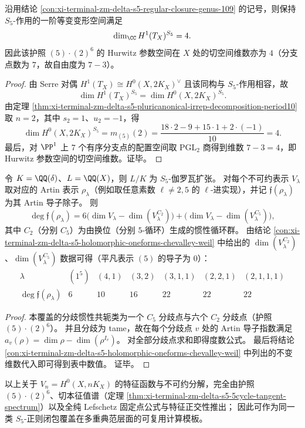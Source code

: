 \begin{proposition}\label{prop:xi-terminal-zm-delta-s5-equivariant-deformation-dimension-4}
沿用结论 \ref{con:xi-terminal-zm-delta-s5-regular-closure-genus-109} 的记号，则保持 \(S_5\)-作用的一阶等变变形空间满足
\[
\dim_\CC H^1(T_X)^{S_5}=4.
\]
因此该护照 \((5)\cdot(2)^6\) 的 Hurwitz 参数空间在 \(X\) 处的切空间维数亦为 \(4\)（分支点数为 \(7\)，故自由度为 \(7-3\)）。
\end{proposition}
\begin{proof}
由 Serre 对偶 \(H^1(T_X)\cong H^0(X,2K_X)^\vee\) 且该同构与 \(S_5\)-作用相容，故
\[
\dim H^1(T_X)^{S_5}=\dim H^0(X,2K_X)^{S_5}.
\]
由定理 \ref{thm:xi-terminal-zm-delta-s5-pluricanonical-irrep-decomposition-period10} 取 \(n=2\)，其中 \(s_2=1\)、\(u_2=-1\)，得
\[
\dim H^0(X,2K_X)^{S_5}=m_{(5)}(2)=\frac{18\cdot 2-9+15\cdot 1+2\cdot(-1)}{10}=4.
\]
最后，对 \(\PP^1\) 上 \(7\) 个有序分支点的配置空间取 \(\mathrm{PGL}_2\) 商得到维数 \(7-3=4\)，即 Hurwitz 参数空间的切空间维数。证毕。
\end{proof}

\begin{proposition}\label{prop:xi-terminal-zm-delta-s5-artin-conductor-degrees}
令 \(K=\QQ(\delta)\)、\(L=\QQ(X)\)，则 \(L/K\) 为 \(S_5\)-伽罗瓦扩张。
对每个不可约表示 \(V_\lambda\) 取对应的 Artin 表示 \(\rho_\lambda\)（例如取任意素数 \(\ell\ne 2,5\) 的 \(\ell\)-进实现），并记 \(\mathfrak f(\rho_\lambda)\) 为其 Artin 导子除子。
则
\[
\deg\mathfrak f(\rho_\lambda)
=6\bigl(\dim V_\lambda-\dim(V_\lambda^{C_2})\bigr)
+\bigl(\dim V_\lambda-\dim(V_\lambda^{C_5})\bigr),
\]
其中 \(C_2\)（分别 \(C_5\)）为由换位（分别 \(5\)-循环）生成的惯性循环群。
由结论 \ref{con:xi-terminal-zm-delta-s5-holomorphic-oneforms-chevalley-weil} 中给出的 \(\dim(V_\lambda^{C_2})\)、\(\dim(V_\lambda^{C_5})\) 数据可得（平凡表示 \((5)\) 的导子为 \(0\)）：
\[
\begin{array}{c|cccccc}
\lambda & (1^5) & (4,1) & (3,2) & (3,1,1) & (2,2,1) & (2,1,1,1)\\ \hline
\deg\mathfrak f(\rho_\lambda) & 6 & 10 & 16 & 22 & 22 & 22
\end{array}
\]
\end{proposition}
\begin{proof}
本覆盖的分歧惯性共轭类为一个 \(C_5\) 分歧点与六个 \(C_2\) 分歧点（护照 \((5)\cdot(2)^6\)）。
并且分歧为 tame，故在每个分歧点 \(v\) 处的 Artin 导子指数满足
\(
a_v(\rho)=\dim\rho-\dim(\rho^{I_v})
\)。
对全部分歧点求和即得度数公式。
最后将结论 \ref{con:xi-terminal-zm-delta-s5-holomorphic-oneforms-chevalley-weil} 中列出的不变维数代入即可得到表中数值。
证毕。
\end{proof}

\begin{remark}[关于表述的可迁移性]\label{rem:xi-terminal-zm-delta-s5-pluricanonical-transferability}
以上关于 \(V_n=H^0(X,nK_X)\) 的特征函数与不可约分解，完全由护照 \((5)\cdot(2)^6\)、切本征值谱（定理 \ref{thm:xi-terminal-zm-delta-s5-5cycle-tangent-spectrum}）以及全纯 Lefschetz 固定点公式与特征正交性推出；
因此可作为同一类 \(S_5\)-正则闭包覆盖在多重典范层面的可复用计算模板。
\end{remark}

\endinput
